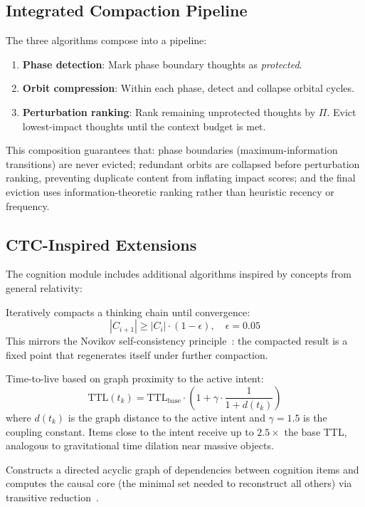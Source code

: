 \documentclass[journal,10pt]{IEEEtran}
\begin{document}
\subsection{Integrated Compaction Pipeline}

The three algorithms compose into a pipeline:
\begin{enumerate}[nosep]
\item \textbf{Phase detection}: Mark phase boundary thoughts as \emph{protected}.
\item \textbf{Orbit compression}: Within each phase, detect and collapse orbital cycles.
\item \textbf{Perturbation ranking}: Rank remaining unprotected thoughts by $\Pi$. Evict lowest-impact thoughts until the context budget is met.
\end{enumerate}

This composition guarantees that: phase boundaries (maximum-information transitions) are never evicted; redundant orbits are collapsed before perturbation ranking, preventing duplicate content from inflating impact scores; and the final eviction uses information-theoretic ranking rather than heuristic recency or frequency.

\subsection{CTC-Inspired Extensions}
\label{sec:ctc}

The cognition module includes additional algorithms inspired by concepts from general relativity:

\begin{description}[nosep,style=unboxed,leftmargin=0pt,font=\normalfont\itshape]
\item[Fixed-point compaction.] Iteratively compacts a thinking chain until convergence:
\begin{equation}
|C_{i+1}| \geq |C_i| \cdot (1 - \epsilon), \quad \epsilon = 0.05
\label{eq:fixedpoint}
\end{equation}
This mirrors the Novikov self-consistency principle~\cite{novikov1989}: the compacted result is a fixed point that regenerates itself under further compaction.

\item[Gravitational TTL.] Time-to-live based on graph proximity to the active intent:
\begin{equation}
\mathrm{TTL}(t_k) = \mathrm{TTL}_{\mathrm{base}} \cdot \left(1 + \gamma \cdot \frac{1}{1 + d(t_k)}\right)
\label{eq:gttl}
\end{equation}
where $d(t_k)$ is the graph distance to the active intent and $\gamma = 1.5$ is the coupling constant. Items close to the intent receive up to $2.5\times$ the base TTL, analogous to gravitational time dilation near massive objects.

\item[Causal DAG analysis.] Constructs a directed acyclic graph of dependencies between cognition items and computes the causal core (the minimal set needed to reconstruct all others) via transitive reduction~\cite{aho1972transitive}.
\end{description}
\end{document}
